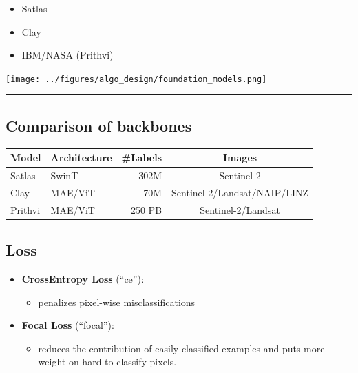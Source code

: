 \documentclass[
  letterpaper,
  DIV=11,
  numbers=noendperiod]{scrartcl}
\providecommand{\tightlist}{%
  \setlength{\itemsep}{0pt}\setlength{\parskip}{0pt}}\usepackage{longtable,booktabs,array}
\begin{document}
\begin{itemize}
\tightlist
\item
  Satlas
\item
  Clay
\item
  IBM/NASA (Prithvi)
\end{itemize}

\begin{center}
\texttt{[image: ../figures/algo\_design/foundation\_models.png]}
\end{center}

\begin{center}\rule{0.5\linewidth}{0.5pt}\end{center}

\subsection{Comparison of backbones}\label{comparison-of-backbones}

\begin{longtable}[]{@{}llrc@{}}
\toprule\noalign{}
Model & Architecture & \#Labels & Images \\
\midrule\noalign{}
\endhead
\bottomrule\noalign{}
\endlastfoot
Satlas & SwinT & 302M & Sentinel-2 \\
Clay & MAE/ViT & 70M & Sentinel-2/Landsat/NAIP/LINZ \\
Prithvi & MAE/ViT & 250 PB & Sentinel-2/Landsat \\
\end{longtable}

\subsection{Loss}\label{loss}

\begin{itemize}
\tightlist
\item
  \textbf{CrossEntropy Loss} (``ce''):

  \begin{itemize}
  \tightlist
  \item
    penalizes pixel-wise misclassifications
  \end{itemize}
\item
  \textbf{Focal Loss} (``focal''):

  \begin{itemize}
  \tightlist
  \item
    reduces the contribution of easily classified examples and puts more
    weight on hard-to-classify pixels.
  \end{itemize}
\end{itemize}
\end{document}
